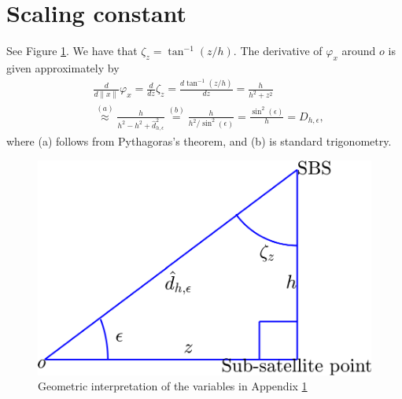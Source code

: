 \documentclass[lettersize,journal]{IEEEtran}
\begin{document}
\appendices




\section{Scaling constant}


\label{app:constantD}
See Figure \ref{fig:triangle}. We have that $\zeta_{z}= \tan^{-1}(z/h)$. The derivative of $\varphi_x$  around $\textit{o}$ is given approximately by
\begin{align}
  &\frac{d}{d \| x\|}\varphi_{x} =\frac{d}{dz}\zeta_{z}  = \frac{d\tan^{-1}(z/h)}{dz} = \frac{h}{h^2 + z^2}   \nonumber\\
  &\overset{(a)}{\approx} \frac{h}{h^2 -h^2 + \hat{d}^2_{h,\epsilon}}  \overset{(b)}{=}\frac{h}{ h^2/\sin^2(\epsilon)} = \frac{\sin^2(\epsilon)}{h} = D_{h,\epsilon},
\end{align}
where (a) follows from Pythagoras's theorem, and (b) is standard trigonometry.

\begin{figure}[h]
  \centering
  \includegraphics[width=0.7\linewidth]{triangle.pdf}
  \caption{Geometric interpretation of the variables in Appendix \ref{app:constantD} }
  \label{fig:triangle}
\end{figure}







%

\end{document}
